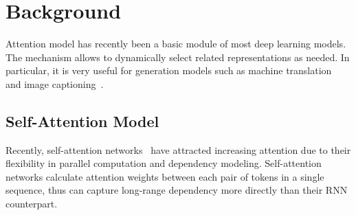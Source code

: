 \documentclass[11pt,a4paper]{article}
\begin{document}
\iffalse
In addition, recent work \cite{shi2016does,Vaswani:2017:NIPS,Peters:2018:NAACL} revealed that deep architectures can potentially lead to progressively more abstract features at higher layers of representations. Partially inspired by the success of CNN model \cite{krizhevsky2012imagenet} and hierarchical RNN models \cite{tai2015improved, yang2017towards}, the basic principles of the heuristic are: the short-term dependencies are expected to capture in lower layers, while the long-term dependencies are captured in higher layers. We also want to differentiate between different representation usages of self-attentive layers.
Intuitively, we expect self-attention models to capture short-term dependencies among neighboring words in lower layers, as well as to capture long-term dependencies beyond phrase boundaries in higher layers.
However, further analysis and visualizations, which provided deeply understanding on the corporately behavior of multiple self-attentive layers on learning the localness, demonstrate not exactly same phenomenon as our intuition and practices in previous studies of other networks. 
In addition, partially inspired by the success of CNN model \cite{krizhevsky2012imagenet} and hierarchical RNN models \cite{tai2015improved, yang2017towards}, the basic principles of the heuristic are: the short-term dependencies are expected to capture in lower layers, while the long-term dependencies are captured in higher layers. We also want to differentiate between different representation usages of self-attentive layers.
\fi




\section{Background}
Attention model has recently been a basic module of most deep learning models. The mechanism allows to dynamically select related representations as needed. In particular, it is very useful for generation models such as machine translation~\cite{bahdanau2015neural,luong2015effective,yang2017towards} and image captioning~\cite{xu2015show}.


\subsection{Self-Attention Model}


Recently, self-attention networks~\cite{Vaswani:2017:NIPS,shaw2018self,Shen:2018:AAAI} have attracted increasing attention due to their flexibility in parallel computation and dependency modeling. Self-attention networks calculate attention weights between each pair of tokens in a single sequence, thus can capture long-range dependency more directly than their RNN counterpart.
\end{document}
